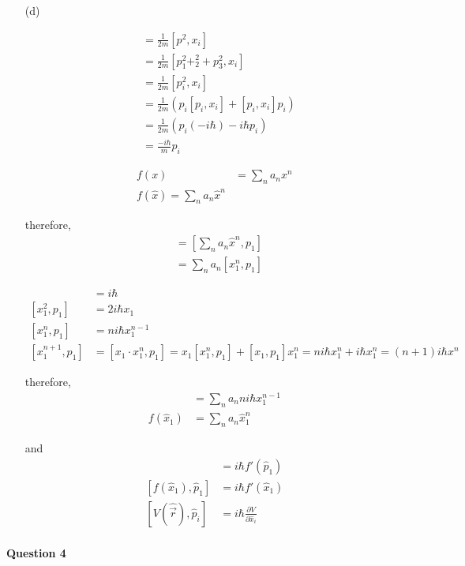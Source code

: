 \documentclass[11pt,a4paper]{article}
\begin{document}
\begin{enumerate}
\item[(d)]

\begin{align*}
[\frac{p^2}{2m},x_i]&=\frac{1}{2m}[p^2,x_i]\\
&=\frac{1}{2m}[p_1^2+_2^2+p_3^2,x_i]\\
&=\frac{1}{2m}[p_i^2,x_i]\\
&=\frac{1}{2m}(p_i[p_i,x_i]+[p_i,x_i]p_i)\\
&=\frac{1}{2m}(p_i(-i\hbar)-i\hbar p_i)\\
&=\frac{-i\hbar}{m}p_i
\end{align*}

\begin{align*}
f(x)&=\sum_n a_n x^n\\
f(\hat{x})=\sum_n a_n \hat{x}^n
\end{align*}

therefore,
\begin{align*}
[f(\hat{x}),p_1]&=[\sum_n a_n \hat{x}^n,p_1]\\
&=\sum_n a_n [x_1^n,p_1]
\end{align*}

\begin{align*}
[x_1,p_1]&=i\hbar\\
[x_1^2,p_1]&=2i\hbar x_1\\
[x_1^n,p_1]&=ni\hbar x_1^{n-1}\\
[x_1^{n+1},p_1]&=[x_1\cdot x_1^n,p_1]=x_1[x_1^n,p_1]+[x_1,p_1]x_1^n=ni\hbar x_1^n+i\hbar x_1^n=(n+1)i\hbar x^n
\end{align*}

\newpage

therefore,
\begin{align*}
&=\sum_n a_nni\hbar x_1^{n-1}\\
f(\hat{x}_1)&=\sum_n a_n\hat{x}_1^n
\end{align*}

and
\begin{align*}
[\hat{x}_1,f(\hat{x}_1)]&=i\hbar f'(\hat{p}_1)\\
[f(\hat{x}_1),\hat{p}_1]&=i\hbar f'(\hat{x}_1)\\
[V(\hat{\vec{r}}),\hat{p}_i]&=i\hbar\frac{\partial V}{\partial \hat{x}_i}
\end{align*}

\end{enumerate}

\newpage

\paragraph{Question 4}
\end{document}
